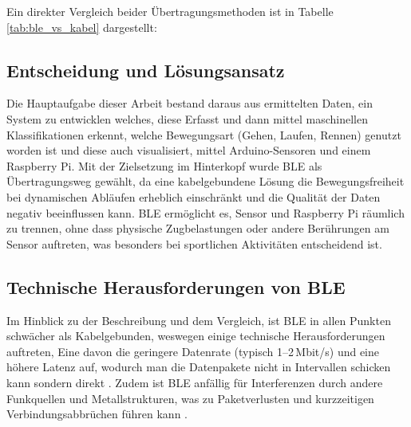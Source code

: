 Ein direkter Vergleich beider Übertragungsmethoden ist in Tabelle \ref{tab:ble_vs_kabel} dargestellt:

\bgroup
\def\arraystretch{1.5}
\begin{table}[h]
	\centering
	\caption{Vergleich von BLE und Kabel}
	\label{tab:ble_vs_kabel}
\end{table}
\egroup

\subsection{Entscheidung und Lösungsansatz}
Die Hauptaufgabe dieser Arbeit bestand daraus aus ermittelten Daten, ein System zu entwicklen welches, diese Erfasst und dann mittel maschinellen Klassifikationen erkennt, welche Bewegungsart (Gehen, Laufen, Rennen) genutzt worden ist und diese auch visualisiert, mittel Arduino-Sensoren und einem Raspberry Pi. Mit der Zielsetzung im Hinterkopf wurde BLE als Übertragungsweg gewählt, da eine kabelgebundene Lösung die Bewegungsfreiheit bei dynamischen Abläufen erheblich einschränkt und die Qualität der Daten negativ beeinflussen kann. BLE ermöglicht es, Sensor und Raspberry Pi räumlich zu trennen, ohne dass physische Zugbelastungen oder andere Berührungen am Sensor auftreten, was besonders bei sportlichen Aktivitäten entscheidend ist.

\subsection{Technische Herausforderungen von BLE}
Im Hinblick zu der Beschreibung und dem Vergleich, ist BLE in allen Punkten schwächer als Kabelgebunden, weswegen einige technische Herausforderungen auftreten,
Eine davon die geringere Datenrate (typisch 1–2 Mbit/s) und eine höhere Latenz auf, wodurch man die Datenpakete nicht in Intervallen schicken kann sondern direkt \cite{zachariah2022reliable}. Zudem ist BLE anfällig für Interferenzen durch andere Funkquellen und Metallstrukturen, was zu Paketverlusten und kurzzeitigen Verbindungsabbrüchen führen kann \cite{s21072257, zachariah2022reliable}.


